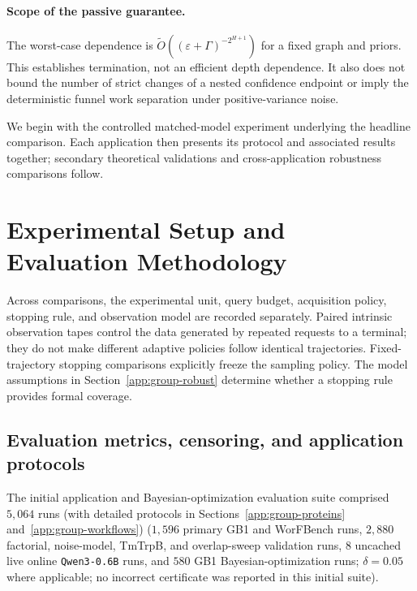 \documentclass{article}
\theoremstyle{plain}
\theoremstyle{definition}
\begin{document}
\paragraph{Scope of the passive guarantee.}
The worst-case dependence is
$\widetilde O((\varepsilon+\Gamma)^{-2^{H+1}})$ for a fixed graph and priors.
This establishes termination, not an efficient depth dependence. It also does
not bound the number of strict changes of a nested confidence endpoint or
imply the deterministic funnel work separation under positive-variance noise.

\clearpage
{}
{}
\par\medskip
We begin with the controlled matched-model experiment underlying the headline comparison. Each application then presents its protocol and associated results together; secondary theoretical validations and cross-application robustness comparisons follow.

\section{Experimental Setup and Evaluation Methodology}
\label{app:group-protocols}

Across comparisons, the experimental unit, query budget, acquisition policy, stopping rule, and observation model are recorded separately. Paired intrinsic observation tapes control the data generated by repeated requests to a terminal; they do not make different adaptive policies follow identical trajectories. Fixed-trajectory stopping comparisons explicitly freeze the sampling policy. The model assumptions in Section~\ref{app:group-robust} determine whether a stopping rule provides formal coverage.

\subsection{Evaluation metrics, censoring, and application protocols}
\label{sec:real-world-appendix}\label{app:realworld-expanded}

The initial application and Bayesian-optimization evaluation suite comprised $5{,}064$ runs (with detailed protocols in Sections~\ref{app:group-proteins} and~\ref{app:group-workflows}) ($1{,}596$ primary GB1 and WorFBench runs, $2{,}880$ factorial, noise-model, TmTrpB, and overlap-sweep validation runs, $8$ uncached live online \texttt{Qwen3-0.6B} runs, and $580$ GB1 Bayesian-optimization runs; $\delta=0.05$ where applicable; no incorrect certificate was reported in this initial suite).
\end{document}
